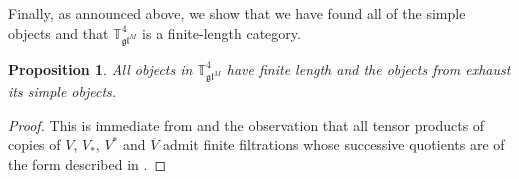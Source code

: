 \documentclass[11pt]{article}
\theoremstyle{plain}
\newtheorem{proposition}[lemma]{Proposition}
\theoremstyle{nonumberplain}
\theoremstyle{plain}
\theoremstyle{nonumberplain}
\newtheorem{proof}{Proof}
\newcommand\bT{{\mathbb T}}
\newcommand\fgl{\mathfrak{gl}}
\newcommand\ol{\overline}
\begin{document}
Finally, as announced above, we show that we have found all of the simple objects and that $\bT^4_{\fgl^M}$ is a finite-length category. 


\begin{proposition}\label{pr.4diag}
  All objects in $\bT^4_{\fgl^M}$ have finite length and the objects from  exhaust its simple objects. 
\end{proposition}
\begin{proof}
  This is immediate from  and the observation that all tensor products of copies of $V$, $V_*$, $V^*$ and $\ol{V}$ admit finite filtrations whose successive quotients are of the form described in .  
\end{proof}











{}




\Addresses
\end{document}

